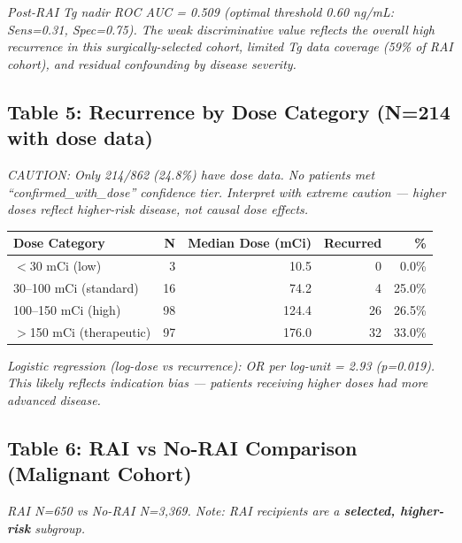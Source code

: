 \documentclass{article}
\begin{document}
\vspace{0.3cm}
\noindent\textit{Post-RAI Tg nadir ROC AUC = 0.509 (optimal threshold 0.60 ng/mL: Sens=0.31, Spec=0.75).
The weak discriminative value reflects the overall high recurrence in this surgically-selected cohort,
limited Tg data coverage (59\% of RAI cohort), and residual confounding by disease severity.}

\subsection*{Table 5: Recurrence by Dose Category (N=214 with dose data)}
\textit{CAUTION: Only 214/862 (24.8\%) have dose data. No patients met ``confirmed\_with\_dose'' confidence tier.
Interpret with extreme caution --- higher doses reflect higher-risk disease, not causal dose effects.}

\begin{tabular}{lrrrr}
\toprule
Dose Category & N & Median Dose (mCi) & Recurred & \% \\
\midrule
$<$30 mCi (low)              &  3 &  10.5 &  0 &  0.0\% \\
30--100 mCi (standard)       & 16 &  74.2 &  4 & 25.0\% \\
100--150 mCi (high)          & 98 & 124.4 & 26 & 26.5\% \\
$>$150 mCi (therapeutic)     & 97 & 176.0 & 32 & 33.0\% \\
\bottomrule
\end{tabular}

\vspace{0.3cm}
\noindent\textit{Logistic regression (log-dose vs recurrence): OR per log-unit = 2.93 (p=0.019).
This likely reflects indication bias --- patients receiving higher doses had more advanced disease.}

\subsection*{Table 6: RAI vs No-RAI Comparison (Malignant Cohort)}
\textit{RAI N=650 vs No-RAI N=3,369. Note: RAI recipients are a \textbf{selected, higher-risk} subgroup.}
\end{document}
